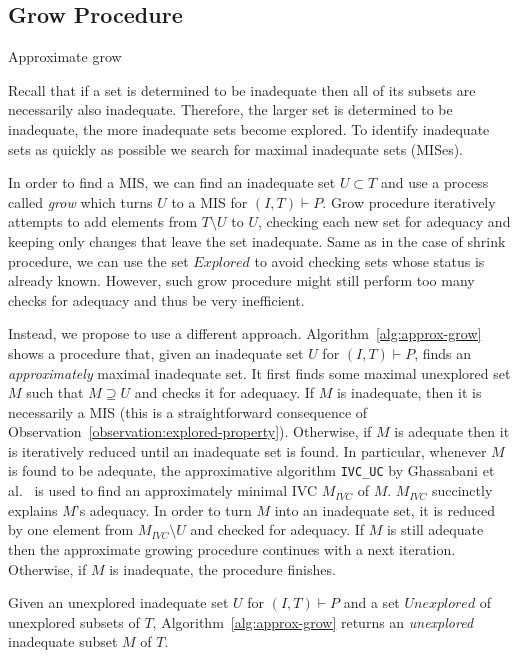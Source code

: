 \subsection{Grow Procedure}\label{sec:grow}
\begin{algorithm}[!t]
\label{alg:approx-grow}

\caption{Approximate grow}
\end{algorithm}

Recall that if a set is determined to be inadequate then all of its subsets are necessarily also inadequate. Therefore, the larger set is determined to be inadequate, the more inadequate sets become explored.  %
To identify inadequate sets as quickly as possible we search for maximal inadequate sets (MISes).

In order to find a MIS, we can find an inadequate set $U \subset T$ and use a process called \emph{grow} which turns $U$ to a MIS for $(I,T) \vdash P$.
Grow procedure iteratively attempts to add elements from $T \setminus U$ to $U$, checking each new set for adequacy and keeping only changes that leave the set inadequate. Same as in the case of shrink procedure, we can use the set $Explored$ to avoid checking sets whose status is already known.
However, such grow procedure might still perform too many checks for adequacy and thus be very inefficient.


Instead, we propose to use a different approach. Algorithm~\ref{alg:approx-grow} shows a procedure that, given an inadequate set $U$ for $(I, T) \vdash P$, finds an \emph{approximately} maximal inadequate set.
It first finds some maximal unexplored set $M$ such that $M \supseteq U$ and checks it for adequacy.
If $M$ is inadequate, then it is necessarily a MIS
(this is a straightforward consequence of Observation~\ref{observation:explored-property}).
Otherwise, if $M$ is adequate then it is iteratively reduced until an inadequate set is found.
In particular, whenever $M$ is found to be adequate, the approximative algorithm \texttt{IVC\_UC} by Ghassabani et al.~\cite{Ghass16} is used to find an approximately minimal IVC $M_{IVC}$ of $M$.  $M_{IVC}$ succinctly explains $M$'s adequacy. In order to turn $M$ into an inadequate set, it is reduced by one element from $M_{IVC} \setminus U$ and checked for adequacy. If $M$ is still adequate then the approximate growing procedure continues with a next iteration. Otherwise, if $M$ is inadequate, the procedure finishes.

\begin{proposition}
Given an unexplored inadequate set $U$ for $(I,T) \vdash P$ and a set $\mathit{Unexplored}$ of unexplored subsets of $T$, Algorithm~\ref{alg:approx-grow} returns an \emph{unexplored} inadequate subset $M$ of $T$.
\end{proposition}

